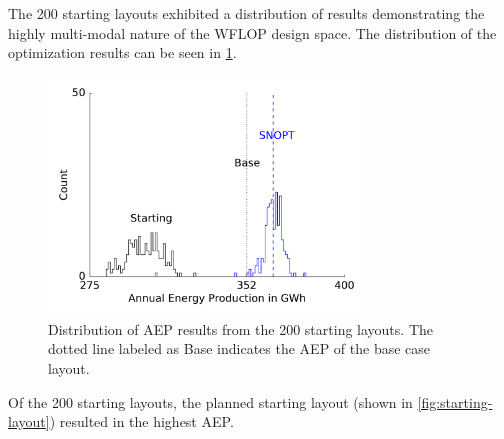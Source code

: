 \documentclass[conf]{new-aiaa}
\begin{document}
{ The 200 starting layouts exhibited a distribution of results demonstrating the highly multi-modal nature of the WFLOP design space. The distribution of the optimization results can be seen in \cref{fig:opt-distribution}.

\begin{figure}[ht]
	\centering
	\includegraphics[width=0.75\textwidth]{final_images/orig_dist.pdf}
	\caption{Distribution of AEP results from the 200 starting layouts. The dotted line labeled as Base indicates the AEP of the base case layout.}
	\label{fig:opt-distribution}
\end{figure}

Of the 200 starting layouts, the planned starting layout (shown in \cref{fig:starting-layout}) resulted in the highest AEP. 





}
\end{document}
